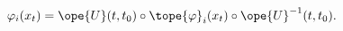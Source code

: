 \begin{equation}	\label{12.60}
\varphi_i(x_t)
=
\ope{U}(t,t_0) \circ \tope{\varphi}_i(x_t)\circ  \ope{U}^{-1}(t,t_0) .
	\end{equation}

